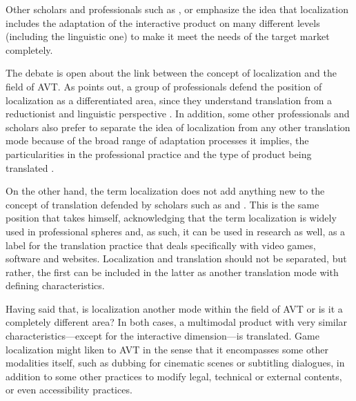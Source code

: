 \documentclass[output=paper]{langsci/langscibook}
\begin{document}
Other scholars and professionals such as \textcite{munoz17}, \textcite{graetal15} or \textcite{manoha06} emphasize the idea that localization includes the adaptation of the interactive product on many different levels (including the linguistic one) to make it meet the needs of the target market completely. 

The debate is open about the link between the concept of localization and the field of AVT. As \textcite[9--23]{vazquez18} points out, a group of professionals defend the position of localization as a differentiated area, since they understand translation from a reductionist and linguistic perspective \parencite[cf.][]{cadess04}. In addition, some other professionals and scholars also prefer to separate the idea of localization from any other translation mode because of the broad range of adaptation processes it implies, the particularities in the professional practice and the type of product being translated \parencites{pym16}{mendez15}{jimenez13}{mata05}.

On the other hand, the term localization does not add anything new to the concept of translation defended by scholars such as \textcites{bernal06}{bernal15} and \textcite{ohaman13}. This is the same position that \textcite{vazquez18} takes himself, acknowledging that the term localization is widely used in professional spheres and, as such, it can be used in research as well, as a label for the translation practice that deals specifically with video games, software and websites. Localization and translation should not be separated, but rather, the first can be included in the latter as another translation mode with defining characteristics.

Having said that, is localization another mode within the field of AVT or is it a completely different area? In both cases, a multimodal product with very similar characteristics—except for the interactive dimension—is translated. Game localization might liken to AVT in the sense that it encompasses some other modalities itself, such as dubbing for cinematic scenes or subtitling dialogues, in addition to some other practices to modify legal, technical or external contents, or even accessibility practices.
\end{document}
